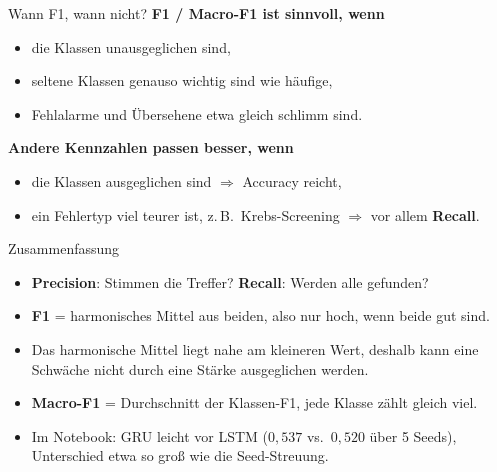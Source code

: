 \documentclass[aspectratio=169,11pt]{beamer}
\begin{document}
\begin{frame}{Wann F1, wann nicht?}
  \textbf{F1 / Macro-F1 ist sinnvoll, wenn}
  \begin{itemize}
    \item die Klassen unausgeglichen sind,
    \item seltene Klassen genauso wichtig sind wie häufige,
    \item Fehlalarme und Übersehene etwa gleich schlimm sind.
  \end{itemize}

  \vspace{0.8em}
  \textbf{Andere Kennzahlen passen besser, wenn}
  \begin{itemize}
    \item die Klassen ausgeglichen sind \(\Rightarrow\) Accuracy reicht,
    \item ein Fehlertyp viel teurer ist, z.\,B.\ Krebs-Screening \(\Rightarrow\) vor allem \textbf{Recall}.
  \end{itemize}
\end{frame}

\begin{frame}{Zusammenfassung}
  \begin{itemize}
    \item \textbf{Precision}: Stimmen die Treffer? \quad \textbf{Recall}: Werden alle gefunden?
    \item \textbf{F1} = harmonisches Mittel aus beiden, also nur hoch, wenn \alert{beide} gut sind.
    \item Das harmonische Mittel liegt nahe am \alert{kleineren} Wert, deshalb kann eine Schwäche nicht durch eine Stärke ausgeglichen werden.
    \item \textbf{Macro-F1} = Durchschnitt der Klassen-F1, jede Klasse zählt gleich viel.
    \item Im Notebook: GRU leicht vor LSTM (\(0{,}537\) vs.\ \(0{,}520\) über 5 Seeds), Unterschied etwa so groß wie die Seed-Streuung.
  \end{itemize}
\end{frame}
\end{document}
